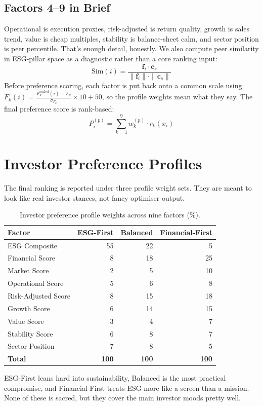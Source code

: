 \subsection{Factors 4--9 in Brief}
Operational is execution proxies, risk-adjusted is return quality, growth is sales trend, value is cheap multiples, stability is balance-sheet calm, and sector position is peer percentile. That's enough detail, honestly.
We also compute peer similarity in ESG-pillar space as a diagnostic rather than a core ranking input:
\begin{equation}
\text{Sim}(i) = \frac{\mathbf{f}_i \cdot \mathbf{c}_s}{\|\mathbf{f}_i\| \cdot \|\mathbf{c}_s\|}
\label{eq:cosine_sim}
\end{equation}
Before preference scoring, each factor is put back onto a common scale using $\tilde{F}_k(i) = \frac{F_k^{\text{scaled}}(i) - \bar{F}_k}{\sigma_{F_k}} \times 10 + 50$, so the profile weights mean what they say.
The final preference score is rank-based:
\begin{equation}
P_i^{(p)} = \sum_{k=1}^{9} w_k^{(p)} \cdot r_k(x_i)
\label{eq:rank_pref}
\end{equation}

\section{Investor Preference Profiles}
\label{sec:investor_profiles}
The final ranking is reported under three profile weight sets. They are meant to look like real investor stances, not fancy optimiser output.
\begin{table}[!htbp]
\centering
\caption{Investor preference profile weights across nine factors (\%).}\label{tab:ch3_profile_weights}\small
\begin{tabular}{@{}lrrr@{}}
\toprule
\textbf{Factor} & \textbf{ESG-First} & \textbf{Balanced} & \textbf{Financial-First} \\
\midrule
ESG Composite & 55 & 22 & 5 \\
Financial Score & 8 & 18 & 25 \\
Market Score & 2 & 5 & 10 \\
Operational Score & 5 & 6 & 8 \\
Risk-Adjusted Score & 8 & 15 & 18 \\
Growth Score & 6 & 14 & 15 \\
Value Score & 3 & 4 & 7 \\
Stability Score & 6 & 8 & 7 \\
Sector Position & 7 & 8 & 5 \\
\midrule
\textbf{Total} & \textbf{100} & \textbf{100} & \textbf{100} \\
\bottomrule
\end{tabular}
\end{table}
ESG-First leans hard into sustainability, Balanced is the most practical compromise, and Financial-First treats ESG more like a screen than a mission. None of these is sacred, but they cover the main investor moods pretty well.

